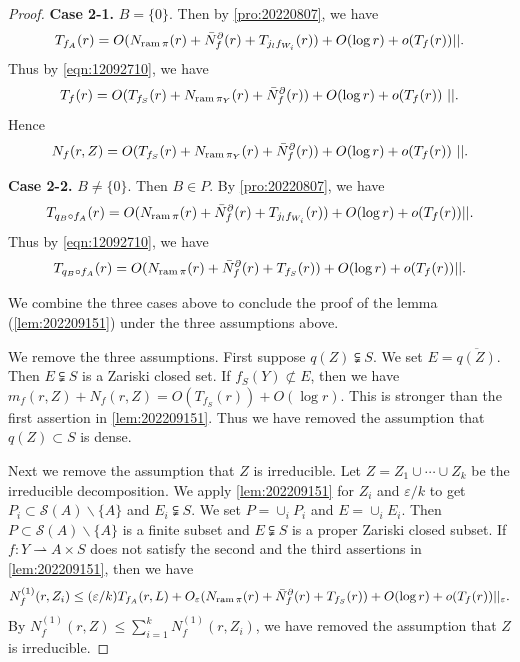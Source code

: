 \documentclass[11pt,english]{smfart}
\theoremstyle{plain}
\theoremstyle{definition}
\theoremstyle{remark}
\numberwithin{equation}{section}
\theoremstyle{plain}
\newcommand{\da}{\rightharpoonup}
\newcommand{\pN}[1]{\bar{N}_{#1}^{\partial}}
\newcommand{\ram}{{\rm ram}\,}
\begin{document}
\begin{proof}
		\par 
		
		\textbf{Case 2-1.}
		$B=\{0\}$.
		Then by \cref{pro:20220807}, we have
		$$
		T_{f_A}(r)=O(N_{\ram\pi}(r)+\pN{f}(r)+T_{j_lf_{W_i}}(r))+O(\log r)+o(T_f(r))||.
		$$
		Thus by \eqref{eqn:12092710}, we have
		$$
		T_f(r)=O (T_{f_S}(r)+N_{\ram \pi _Y}(r)+\pN{f}(r))+O(\log r)+o(T_f(r))\ ||.
		$$
		Hence
		$$
		N_f(r,Z)=O (T_{f_S}(r)+N_{\ram \pi _Y}(r)+\pN{f}(r))+O(\log r)+o(T_f(r))\ ||.
		$$
		
		\par
		
		
		\textbf{Case 2-2.} $B\not=\{0\}$.
		Then $B\in P$.
		By \cref{pro:20220807}, we have
		$$
		T_{q_B\circ f_A}(r)
		=O(N_{\ram\pi}(r)+\pN{f}(r)+T_{j_lf_{W_i}}(r))+O(\log r)+o(T_f(r))||.
		$$
		Thus by \eqref{eqn:12092710}, we have
		$$
		T_{q_B\circ f_A}(r)=O(N_{\ram\pi}(r)+\pN{f}(r)+T_{f_S}(r))+O(\log r)+o(T_f(r))||.
		$$
		
		\par
		
		We combine the three cases above to conclude the proof of the lemma (\cref{lem:202209151}) under the three assumptions above.
		
		We remove the three assumptions.
		First suppose $q(Z)\subsetneqq S$.
		We set $E=\overline{q(Z)}$.
		Then $E\subsetneqq S$ is a Zariski closed set.
		If $f_S(Y)\not\subset E$, then we have $m_f(r,Z)+N_f(r,Z)=O(T_{f_S}(r))+O(\log r)$.
		This is stronger than the first assertion in \cref{lem:202209151}.
		Thus we have removed the assumption that $q(Z)\subset S$ is dense.	
		
		Next we remove the assumption that $Z$ is irreducible.
		Let $Z=Z_1\cup \cdots\cup Z_k$ be the irreducible decomposition.
		We apply \cref{lem:202209151} for $Z_i$ and $\varepsilon/k$ to get $P_i\subset \mathcal{S}(A)\backslash \{A\}$ and $E_i\subsetneqq S$.
		We set $P=\cup_{i}P_i$ and $E=\cup_iE_i$.
		Then $P\subset \mathcal{S}(A)\backslash\{A\}$ is a finite subset and $E\subsetneqq S$ is a proper Zariski closed subset.
		If $f:Y\da A\times S$ does not satisfy the second and the third assertions in \cref{lem:202209151}, then we have 
		$$
		N^{(1)}_f(r,Z_i)\leq (\varepsilon/k) T_{f_A}(r,L)+O_{\varepsilon}(N_{\ram\pi}(r)+\pN{f}(r)
		+T_{f_S}(r))+O(\log r)+o(T_f(r))||_{\varepsilon}.
		$$
		By $N^{(1)}_f(r,Z)\leq \sum_{i=1}^kN^{(1)}_f(r,Z_i)$, we have removed the assumption that $Z$ is irreducible.	
		

\end{proof}
\end{document}
